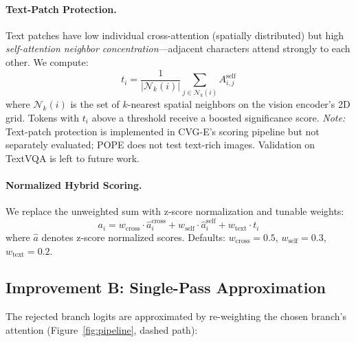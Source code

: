 \documentclass[10pt,twocolumn]{article}
\begin{document}
\paragraph{Text-Patch Protection.} Text patches have low individual cross-attention (spatially distributed) but high \emph{self-attention neighbor concentration}---adjacent characters attend strongly to each other. We compute:
\begin{equation}
t_i = \frac{1}{|\mathcal{N}_k(i)|} \sum_{j \in \mathcal{N}_k(i)} A^{\text{self}}_{i,j} \label{eq:text}
\end{equation}
where $\mathcal{N}_k(i)$ is the set of $k$-nearest spatial neighbors on the vision encoder's 2D grid. Tokens with $t_i$ above a threshold receive a boosted significance score. \emph{Note:} Text-patch protection is implemented in CVG-E's scoring pipeline but not separately evaluated; POPE does not test text-rich images. Validation on TextVQA is left to future work.

\paragraph{Normalized Hybrid Scoring.} We replace the unweighted sum with z-score normalization and tunable weights:
\begin{equation}
a_i = w_{\text{cross}} \cdot \hat{a}_i^{\text{cross}} + w_{\text{self}} \cdot \hat{a}_i^{\text{self}} + w_{\text{text}} \cdot t_i \label{eq:score}
\end{equation}
where $\hat{a}$ denotes z-score normalized scores. Defaults: $w_{\text{cross}}=0.5$, $w_{\text{self}}=0.3$, $w_{\text{text}}=0.2$.

\subsection{Improvement B: Single-Pass Approximation}

The rejected branch logits are approximated by re-weighting the chosen branch's attention (Figure~\ref{fig:pipeline}, dashed path):
\end{document}
